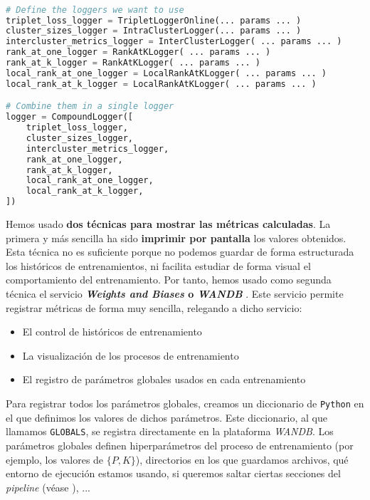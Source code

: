 \begin{lstlisting}[language=python, caption=Ejemplo de configuración del \textit{logging} de un entrenamiento con nuestro sistema propio. Se ve claramente la ventaja de usar un patrón \textit{composite} a la hora de configurar qué \textit{loggers} queremos usar, captionpos=b]

# Define the loggers we want to use
triplet_loss_logger = TripletLoggerOnline(... params ... )
cluster_sizes_logger = IntraClusterLogger(... params ... )
intercluster_metrics_logger = InterClusterLogger( ... params ... )
rank_at_one_logger = RankAtKLogger( ... params ... )
rank_at_k_logger = RankAtKLogger( ... params ... )
local_rank_at_one_logger = LocalRankAtKLogger( ... params ... )
local_rank_at_k_logger = LocalRankAtKLogger( ... params ... )

# Combine them in a single logger
logger = CompoundLogger([
    triplet_loss_logger,
    cluster_sizes_logger,
    intercluster_metrics_logger,
    rank_at_one_logger,
    rank_at_k_logger,
    local_rank_at_one_logger,
    local_rank_at_k_logger,
])
\end{lstlisting}

Hemos usado \textbf{dos técnicas para mostrar las métricas calculadas}. La primera y más sencilla ha sido \textbf{imprimir por pantalla} los valores obtenidos. Esta técnica no es suficiente porque no podemos guardar de forma estructurada los históricos de entrenamientos, ni facilita estudiar de forma visual el comportamiento del entrenamiento. Por tanto, hemos usado como segunda técnica el servicio \textbf{\textit{Weights and Biases} o \textit{WANDB}} \cite{informatica:wandb_web}. Este servicio permite registrar métricas de forma muy sencilla, relegando a dicho servicio:

\begin{itemize}
    \item El control de históricos de entrenamiento
    \item La visualización de los procesos de entrenamiento
    \item El registro de parámetros globales usados en cada entrenamiento
\end{itemize}

Para registrar todos los parámetros globales, creamos un diccionario de \lstinline{Python} en el que definimos los valores de dichos parámetros. Este diccionario, al que llamamos \lstinline{GLOBALS}, se registra directamente en la plataforma \textit{WANDB}. Los parámetros globales definen hiperparámetros del proceso de entrenamiento (por ejemplo, los valores de $\{P, K\}$), directorios en los que guardamos archivos, qué entorno de ejecución estamos usando, si queremos saltar ciertas secciones del \textit{pipeline} (véase ), ...

